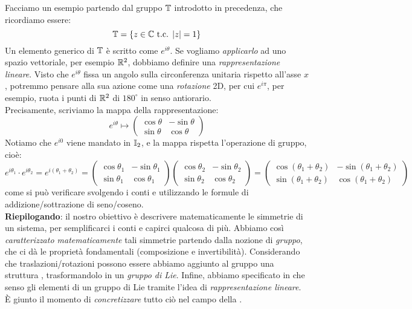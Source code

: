 \documentclass[../../FisicaTeorica.tex]{subfiles}
\begin{document}
Facciamo un esempio partendo dal gruppo $\mathbb{T}$ introdotto in precedenza, che ricordiamo essere:
\[
\mathbb{T} =\{z \in \mathbb{C} \text{ t.c. } |z|=1\}
\]
Un elemento generico di $\mathbb{T}$ è scritto come $e^{i\theta}$. Se vogliamo \textit{applicarlo} ad uno spazio vettoriale, per esempio $\mathbb{R}^2$, dobbiamo definire una \textit{rappresentazione lineare}. Visto che $e^{i\theta}$ fissa un angolo sulla circonferenza unitaria rispetto all'asse $x$, potremmo pensare alla sua azione come una \textit{rotazione} 2D, per cui $e^{i\pi}$, per esempio, ruota i punti di $\mathbb{R}^2$ di $180^\circ$ in senso antiorario.\\
Precisamente, scriviamo la mappa della rappresentazione:
\[
e^{i\theta} \mapsto \begin{pmatrix}
\cos\theta & -\sin\theta\\
\sin\theta & \cos\theta
\end{pmatrix}
\]
Notiamo che $e^{i0}$ viene mandato in $\mathbb{I}_2$, e la mappa rispetta l'operazione di gruppo, cioè:
\[
e^{i\theta_1} \cdot e^{i\theta_2} = e^{i(\theta_1 +\theta_2)} = \begin{pmatrix}
\cos\theta_1 & -\sin\theta_1\\
\sin\theta_1 & \cos\theta_1
\end{pmatrix}
\begin{pmatrix}
\cos\theta_2 & -\sin\theta_2\\
\sin\theta_2 & \cos\theta_2
\end{pmatrix}
=
\begin{pmatrix}
\cos(\theta_1+\theta_2) & -\sin(\theta_1+\theta_2)\\
\sin(\theta_1+\theta_2) & \cos(\theta_1+\theta_2)
\end{pmatrix}
\]
come si può verificare svolgendo i conti e utilizzando le formule di addizione/sottrazione di seno/coseno.\\

\textbf{Riepilogando}: il nostro obiettivo è descrivere matematicamente le simmetrie di un sistema, per semplificarci i conti e capirci qualcosa di più. Abbiamo così \textit{caratterizzato matematicamente} tali simmetrie partendo dalla nozione di \textit{gruppo}, che ci dà le proprietà fondamentali (composizione e invertibilità). Considerando che traslazioni/rotazioni possono essere  abbiamo aggiunto al gruppo una struttura , trasformandolo in un \textit{gruppo di Lie}. Infine, abbiamo specificato in che senso gli elementi di un gruppo di Lie  tramite l'idea di \textit{rappresentazione lineare}.\\
È giunto il momento di \textit{concretizzare} tutto ciò nel campo della \MQ.\\
\end{document}
